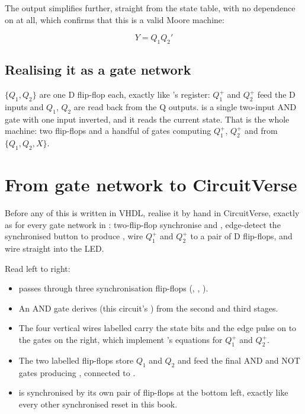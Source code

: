 The output  simplifies further, straight from the state table, with no dependence on
 at all, which confirms that this is a valid Moore machine:

\[ Y = Q_1 Q_2' \]

\subsection*{Realising it as a gate network}
$\{Q_1, Q_2\}$ are one D flip-flop each, exactly like 's register: $Q_1^{+}$ and
$Q_2^{+}$ feed the D inputs and $Q_1$, $Q_2$ are read back from the Q outputs.  is a single
two-input AND gate with one input inverted, and it reads the current state. That is the whole
machine: two flip-flops and a handful of gates computing $Q_1^{+}$, $Q_2^{+}$ and  from
$\{Q_1, Q_2, X\}$.

\section{From gate network to CircuitVerse}
\label{c8:sec:cv}

Before any of this is written in VHDL, realise it by hand in CircuitVerse, exactly as for every gate
network in : two-flip-flop synchronise  and ,
edge-detect the synchronised button to produce , wire $Q_1^{+}$ and $Q_2^{+}$ to a pair of D
flip-flops, and wire  straight into the LED.


Read left to right:
\begin{itemize}
  \item {} passes through three synchronisation flip-flops
    (, , ).
  \item An AND gate derives  (this circuit's ) from the second and
    third stages.
  \item The four vertical wires labelled  carry the state bits and the edge pulse on
    to the gates on the right, which implement 's equations for $Q_1^{+}$ and
    $Q_2^{+}$.
  \item The two labelled flip-flops store $Q_1$ and $Q_2$ and feed the final AND and NOT gates
    producing , connected to .
  \item {} is synchronised by its own pair of flip-flops at the bottom left, exactly
    like every other synchronised reset in this book.
\end{itemize}

